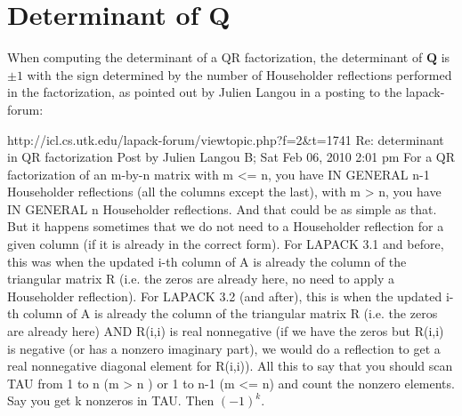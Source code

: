 \documentclass[10pt,openany,twoside]{book}
\numberwithin{equation}{section}   %
\newcommand{\Matrix}[1]{\boldsymbol{#1}}
\begin{document}
\section{Determinant of Q}\label{sect:langou}
When computing the determinant of a QR factorization, the determinant
of $\Matrix{Q}$ is $\pm 1$ with the sign determined by the number
of Householder reflections performed in the factorization,
as pointed out by Julien Langou in a posting to the lapack-forum:
\begin{example}
 http://icl.cs.utk.edu/lapack-forum/viewtopic.php?f=2&t=1741
 Re: determinant in QR factorization
 Post by Julien Langou B; Sat Feb 06, 2010 2:01 pm
 For a QR factorization of an m-by-n matrix with m <= n,
 you have IN GENERAL n-1 Householder reflections (all the
 columns except the last), with m > n, you have IN GENERAL n
 Householder reflections. And that could be as simple as that.
 But it happens sometimes that we do not need to a Householder
 reflection for a given column (if it is already in the correct
 form). For LAPACK 3.1 and before, this was when the updated
 i-th column of A is already the column of the triangular
 matrix R (i.e. the zeros are already here, no need to apply
 a Householder reflection). For LAPACK 3.2 (and after), this
 is when the updated i-th column of A is already the column of
 the triangular matrix R (i.e. the zeros are already here) AND
 R(i,i) is real nonnegative (if we have the zeros but R(i,i)
 is negative (or has a nonzero imaginary part), we would
 do a reflection to get a real nonnegative diagonal element
 for R(i,i)).  All this to say that you should scan TAU from
 1 to n (m > n ) or 1 to n-1 (m <= n) and count the nonzero
 elements. Say you get k nonzeros in TAU.  Then $(-1)^k$.
\end{example}

\newpage

\printbibliography[heading=bibintoc]

\newpage
{}
\printindex
\end{document}
